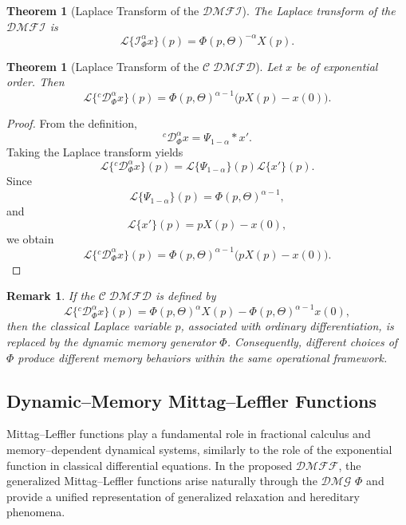 \documentclass[11pt]{article}
\numberwithin{equation}{section}
\newtheorem{theorem}[definition]{Theorem}
\newtheorem{remark}[definition]{Remark}
\begin{document}

\begin{theorem}[Laplace Transform of the $\mathcal{DMFI}$]
The Laplace transform of the $\mathcal{DMFI}$ is
\[
\mathcal L
\{
\mathcal I_\Phi^\alpha x
\}(p)
=
\Phi(p,\Theta)^{-\alpha}X(p).
\]
\end{theorem}


\begin{theorem}[Laplace Transform of the $\mathcal{C\;DMFD}$]
Let $x$ be of exponential order. Then
\[
\mathcal L
\{
{}^c\mathcal D_\Phi^\alpha x
\}(p)
=
\Phi(p,\Theta)^{\alpha-1}
\big(
pX(p)-x(0)
\big).
\]
\end{theorem}

\begin{proof}
From the definition,
\[
{}^c\mathcal D_\Phi^\alpha x
=
\Psi_{1-\alpha}*x'.
\]
Taking the Laplace transform yields
\[
\mathcal L
\{
{}^c\mathcal D_\Phi^\alpha x
\}(p)
=
\mathcal L
\{
\Psi_{1-\alpha}
\}(p)
\mathcal L
\{
x'
\}(p).
\]
Since
\[
\mathcal L
\{
\Psi_{1-\alpha}
\}(p)
=
\Phi(p,\Theta)^{\alpha-1},
\]
and
\[
\mathcal L\{x'\}(p)
=
pX(p)-x(0),
\]
we obtain
\[
\mathcal L
\{
{}^c\mathcal D_\Phi^\alpha x
\}(p)
=
\Phi(p,\Theta)^{\alpha-1}
\big(
pX(p)-x(0)
\big).
\]
\end{proof}


\begin{remark}
If the $\mathcal{C\;DMFD}$ is defined by
\[
\mathcal L
\{
{}^c\mathcal D_\Phi^\alpha x
\}(p)
=
\Phi(p,\Theta)^\alpha X(p)
-
\Phi(p,\Theta)^{\alpha-1}x(0),
\]
then the classical Laplace variable \(p\), associated with ordinary differentiation,
is replaced by the dynamic memory generator \(\Phi\). Consequently,
different choices of \(\Phi\) produce different memory behaviors within the same
operational framework.
\end{remark}

\subsection{Dynamic--Memory Mittag--Leffler Functions}

Mittag--Leffler functions play a fundamental role in fractional calculus and memory--dependent dynamical systems, similarly to the role of the exponential function in classical differential equations. In the proposed $\mathcal{DMFF}$, the generalized Mittag--Leffler functions arise naturally through the $\mathcal{DMG}$ $\Phi$ and provide a unified representation of generalized relaxation and hereditary phenomena.
\end{document}
